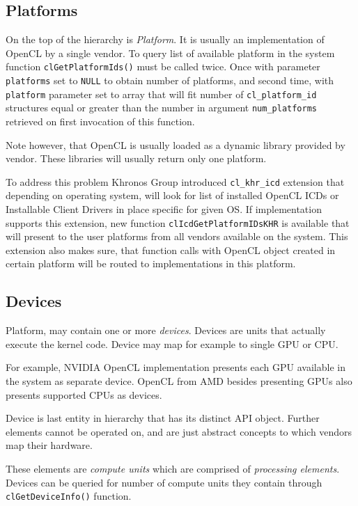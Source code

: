 \subsection{Platforms}

On the top of the hierarchy is \emph{Platform}. It is usually an implementation
of OpenCL by a single vendor. To query list of available platform in the system
function \texttt{clGetPlatformIds()} must be called twice. Once with parameter
\texttt{platforms} set to \texttt{NULL} to obtain number of platforms, and
second time, with \texttt{platform} parameter set to array that will fit
number of \texttt{cl\_platform\_id} structures equal or greater than the number
in argument \texttt{num\_platforms} retrieved on first invocation of this
function.

Note however, that OpenCL is usually loaded as a dynamic library provided by
vendor. These libraries will usually return only one platform.

To address this problem Khronos Group introduced \texttt{cl\_khr\_icd} extension
that depending on operating system, will look for list of installed OpenCL
ICDs or Installable Client Drivers in place specific for given OS. If
implementation supports this extension, new function \texttt{clIcdGetPlatformIDsKHR}
is available that will present to the user platforms from all vendors available
on the system. This extension also makes sure, that function calls with OpenCL
object created in certain platform will be routed to implementations in this
platform.

\subsection{Devices}

Platform, may contain one or more \emph{devices}. Devices are units that
actually execute the kernel code. Device may map for example to single GPU or
CPU.

For example, NVIDIA OpenCL implementation presents each GPU available in the
system as separate device. OpenCL from AMD besides presenting GPUs also presents
supported CPUs as devices.

Device is last entity in hierarchy that has its distinct API object. Further
elements cannot be operated on, and are just abstract concepts to which vendors
map their hardware.

These elements are \emph{compute units} which are comprised of \emph{processing
elements}. Devices can be queried for number of compute units they contain
through \texttt{clGetDeviceInfo()} function.

